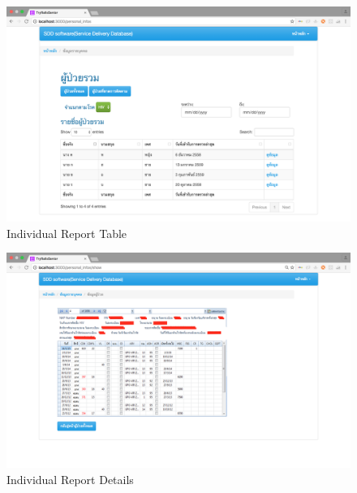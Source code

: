             \FloatBarrier
                \begin{figure}[h!]
                    \centering
                        \includegraphics[width=12cm]{images/chapter-01/mockup_rails/individual_report.png}
                    	\caption{Individual Report Table}
                    	\label{individual_report}
                \end{figure}
            \FloatBarrier
            \FloatBarrier
                \begin{figure}[h!]
                    \centering
                        \includegraphics[width=12cm]{images/chapter-01/mockup_rails/individual_report1.png}
                    	\caption{Individual Report Details}
                    	\label{individual_report1}
                \end{figure}
            \FloatBarrier
            
